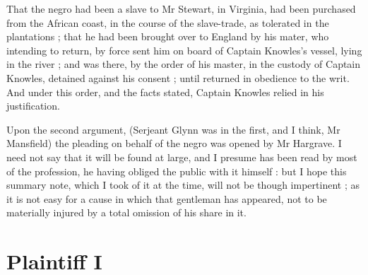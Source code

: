 \documentclass[a4paper]{article}
\begin{document}
That the negro had been a slave to Mr Stewart, in Virginia, had been purchased from the African coast, in the course of the slave-trade, as tolerated in the plantations ; that he had been brought over to England by his mater, who intending to return, by force sent him on board of Captain Knowles's vessel, lying in the river ; and was there, by the order of his master, in the custody of Captain Knowles, detained against his consent ; until returned in obedience to the writ. And under this order, and the facts stated, Captain Knowles relied in his justification.

Upon the second argument, (Serjeant Glynn was in the first, and I think, Mr Mansfield) the pleading on behalf of the negro was opened by Mr Hargrave. I need not say that it will be found at large, and I presume has been read by most of the profession, he having obliged the public with it himself : but I hope this summary note, which I took of it at the time, will not be though impertinent ; as it is not easy for a cause in which that gentleman has appeared, not to be materially injured by a total omission of his share in it.

\section{Plaintiff I}
\end{document}

